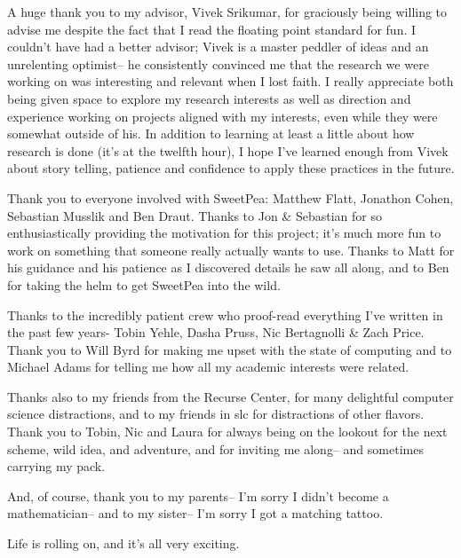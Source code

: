 
A huge thank you to my advisor, Vivek Srikumar, for graciously being willing to advise me despite the fact that I read the floating point standard for fun. I couldn't have had a better advisor; Vivek is a master peddler of ideas and an unrelenting optimist-- he consistently convinced me that the research we were working on was interesting and relevant when I lost faith. I really appreciate both being given space to explore my research interests as well as direction and experience working on projects aligned with my interests, even while they were somewhat outside of his. In addition to learning at least a little about how research is done (it's at the twelfth hour), I hope I've learned enough from Vivek about story telling, patience and confidence to apply these practices in the future.

Thank you to everyone involved with SweetPea: Matthew Flatt, Jonathon Cohen, Sebastian Musslik and Ben Draut. Thanks to Jon \& Sebastian for so enthusiastically providing the motivation for this project; it's much more fun to work on something that someone really actually wants to use. Thanks to Matt for his guidance and his patience as I discovered details he saw all along, and to Ben for taking the helm to get SweetPea into the wild.

Thanks to the incredibly patient crew who proof-read everything I've written in the past few years- Tobin Yehle, Dasha Pruss, Nic Bertagnolli \& Zach Price. Thank you to Will Byrd for making me upset with the state of computing and to Michael Adams for telling me how all my academic interests were related.

Thanks also to my friends from the Recurse Center, for many delightful computer science distractions, and to my friends in slc for distractions of other flavors. Thank you to Tobin, Nic and Laura for always being on the lookout for the next scheme, wild idea, and adventure, and for inviting me along-- and sometimes carrying my pack.

And, of course, thank you to my parents-- I'm sorry I didn't become a mathematician-- and to my sister-- I'm sorry I got a matching tattoo.

Life is rolling on, and it's all very exciting.
